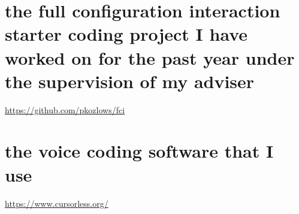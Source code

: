 \documentclass{article}
\begin{document}
\section{the full configuration interaction starter coding project I have worked on for the past year under the supervision of my adviser}
\url{https://github.com/pkozlows/fci}

\section{the voice coding software that I use}
\url{https://www.cursorless.org/}
\end{document}
